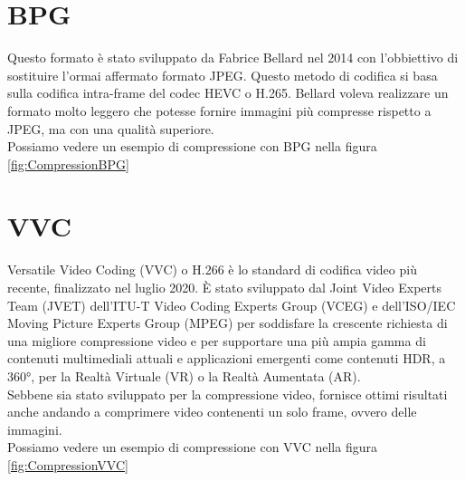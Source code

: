 \section{BPG}
Questo formato è stato sviluppato da Fabrice Bellard nel 2014 con l'obbiettivo di sostituire l’ormai affermato formato JPEG. Questo metodo di codifica si basa sulla codifica intra-frame del codec HEVC o H.265. \cite{BPGImageformat} Bellard voleva realizzare un formato molto leggero che potesse fornire immagini più compresse rispetto a JPEG, ma con una qualità superiore.\\
Possiamo vedere un esempio di compressione con BPG nella figura \ref*{fig:CompressionBPG}

\section{VVC}
Versatile Video Coding (VVC) o H.266 è lo standard di codifica video più recente, finalizzato nel luglio 2020. È stato sviluppato dal Joint Video Experts Team (JVET) dell'ITU-T Video Coding Experts Group (VCEG) e dell'ISO/IEC Moving Picture Experts Group (MPEG) per soddisfare la crescente richiesta di una migliore compressione video e per supportare una più ampia gamma di contenuti multimediali attuali e applicazioni emergenti come contenuti HDR, a 360°, per la Realtà Virtuale (VR) o la Realtà Aumentata (AR).\cite{9503377}\\
Sebbene sia stato sviluppato per la compressione video, fornisce ottimi risultati anche andando a comprimere video contenenti un solo frame, ovvero delle immagini.\\
Possiamo vedere un esempio di compressione con VVC nella figura \ref*{fig:CompressionVVC}

